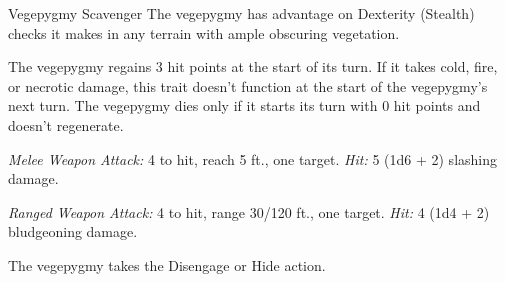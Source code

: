 \documentclass[10pt,a4paper,twoside,bg=print,twocolumn,openany,nodeprecatedcode]{dndbook}
\begin{document}
\begin{DndMonster}[float=t]{Vegepygmy Scavenger}
\DndMonsterBasics[
armor-class = {13 (natural armor)},
hit-points = {\DndDice{3d6 + 3}},
speed = {30 ft.}
]
\DndMonsterAbilityScores[
 str = 7,
 dex = 14,
 con = 13,
 int = 6,
 wis = 11,
 cha = 7
]
\DndMonsterDetails[
skills = {Perception +2, Sleight Of Hand +4, Stealth +4},
damage-resistances = {lightning, piercing},
senses = {darkvision 60 ft., passive perception 12},
languages = {Vegepygmy},
challenge = 1/4,
]
The vegepygmy has advantage on Dexterity (Stealth) checks it makes in any terrain with ample obscuring vegetation.

The vegepygmy regains 3 hit points at the start of its turn. If it takes cold, fire, or necrotic damage, this trait doesn't function at the start of the vegepygmy's next turn. The vegepygmy dies only if it starts its turn with 0 hit points and doesn't regenerate.

\textsl{Melee Weapon Attack:} 4 to hit, reach 5 ft., one target. \textsl{Hit:} 5 (1d6 + 2) slashing damage.

\textsl{Ranged Weapon Attack:} 4 to hit, range 30/120 ft., one target. \textsl{Hit:} 4 (1d4 + 2) bludgeoning damage.

The vegepygmy takes the Disengage or Hide action.

\end{DndMonster}
\end{document}
